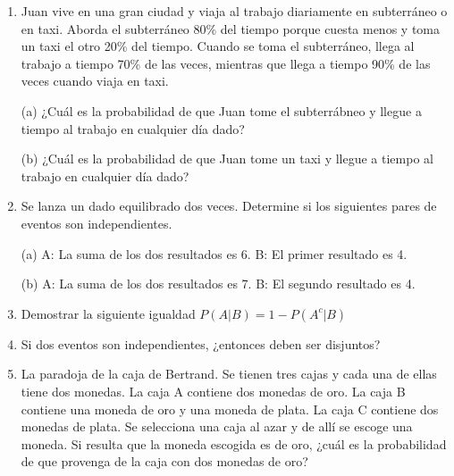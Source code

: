 \documentclass[a4paper, 12pt]{article}
\newcommand{\Pspace}{0.5cm}
\newcommand{\Aspace}{0.2cm}
\begin{document}
\begin{enumerate}
    \item Juan vive en una gran ciudad y viaja al trabajo diariamente en subterráneo o en taxi. Aborda el subterráneo 80\% del tiempo porque cuesta menos y toma un taxi el otro 20\% del tiempo. Cuando se toma el subterráneo, llega al trabajo a tiempo 70\% de las veces, mientras que llega a tiempo 90\% de las veces cuando viaja en taxi.
    \vspace{\Aspace} \par
    (a) ¿Cuál es la probabilidad de que Juan tome el subterrábneo y llegue a tiempo al trabajo en cualquier día dado?
    \\ { \color{azul}  }

    \vspace{\Aspace}
    (b) ¿Cuál es la probabilidad de que Juan tome un taxi y llegue a tiempo al trabajo en cualquier día dado?
    \\ { \color{azul}  }


    \vspace{\Pspace}
    \item Se lanza un dado equilibrado dos veces. Determine si los siguientes pares de eventos son independientes.
    \vspace{\Aspace} \par
    (a) A: La suma de los dos resultados es 6. B: El primer resultado es 4.
    \\ { \color{azul}  }

    \vspace{\Aspace}
    (b) A: La suma de los dos resultados es 7. B: El segundo resultado es 4.
    \\ { \color{azul}  }
    

    \vspace{\Pspace}
    \item Demostrar la siguiente igualdad $P(A | B) = 1 - P(A^{c} | B)$
    \vspace{\Aspace} \par
    { \color{azul}  }

    
    \vspace{\Pspace}
    \item Si dos eventos son independientes, ¿entonces deben ser disjuntos?
    \vspace{\Aspace} \par
    { \color{azul}  }


    \vspace{\Pspace}
    \item La paradoja de la caja de Bertrand. Se tienen tres cajas y cada una de ellas tiene dos monedas. La caja A contiene dos monedas de oro. La caja B contiene una moneda de oro y una moneda de plata. La caja C contiene dos monedas de plata. Se selecciona una caja al azar y de allí se escoge una moneda. Si resulta que la moneda escogida es de oro, ¿cuál es la probabilidad de que provenga de la caja con dos monedas de oro?
    \vspace{\Aspace} \par
    { \color{azul}  }
\end{enumerate}
\end{document}
